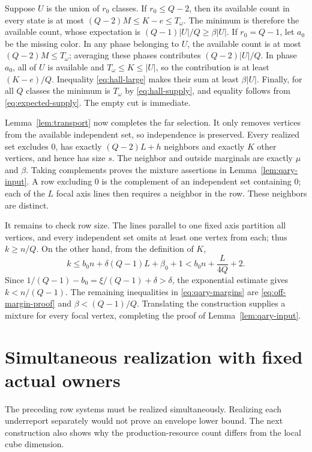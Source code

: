 \documentclass[11pt]{article}
\theoremstyle{definition}
\theoremstyle{remark}
\begin{document}
Suppose $U$ is the union of $r_0$ classes.  If $r_0\le Q-2$, then its
available count in every state is at most $(Q-2)M\le K-e\le T_\omega$.
The minimum is therefore the available count, whose expectation is
$(Q-1)|U|/Q\ge\beta|U|$.
If $r_0=Q-1$, let $a_0$ be the missing color.  In any phase belonging
to $U$, the available count is at most $(Q-2)M\le T_\omega$; averaging
these phases contributes $(Q-2)|U|/Q$.  In phase $a_0$, all of $U$ is
available and $T_\omega\le K\le|U|$, so the contribution is at least
$(K-e)/Q$.  Inequality \eqref{eq:hall-large} makes their sum at least
$\beta|U|$.  Finally, for all $Q$ classes the minimum is $T_\omega$
by \eqref{eq:hall-supply}, and equality follows from
\eqref{eq:expected-supply}.  The empty cut is immediate.

Lemma~\ref{lem:transport} now completes the far selection.  It only
removes vertices from the available independent set, so independence
is preserved.  Every realized set excludes $0$, has exactly
$(Q-2)L+h$ neighbors and exactly $K$ other vertices, and hence has size
$s$.  The neighbor and outside marginals are exactly $\mu$ and $\beta$.
Taking complements proves the mixture assertions in
Lemma~\ref{lem:qary-input}.  A row excluding $0$ is the complement of an
independent set containing $0$; each of the $L$ focal axis lines then
requires a neighbor in the row.  These neighbors are distinct.

It remains to check row size.  The lines parallel to one fixed axis
partition all vertices, and every independent set omits at least one
vertex from each; thus $k\ge n/Q$.  On the other hand, from the definition
of $K$,
\[
 k\le b_0n+\delta(Q-1)L+\beta_0+1
       < b_0n+\frac L{4Q}+2.
\]
Since $1/(Q-1)-b_0=\xi/(Q-1)+\delta>\delta$, the exponential estimate
gives $k<n/(Q-1)$.  The remaining inequalities in
\eqref{eq:qary-margins} are \eqref{eq:off-margin-proof} and
$\beta<(Q-1)/Q$.  Translating the construction supplies a mixture for
every focal vertex, completing the proof of
Lemma~\ref{lem:qary-input}.

\section{Simultaneous realization with fixed actual owners}
\label{app:realization}

The preceding row systems must be realized simultaneously.  Realizing
each underreport separately would not prove an envelope lower bound.
The next construction also shows why the production-resource count
differs from the local cube dimension.
\end{document}
